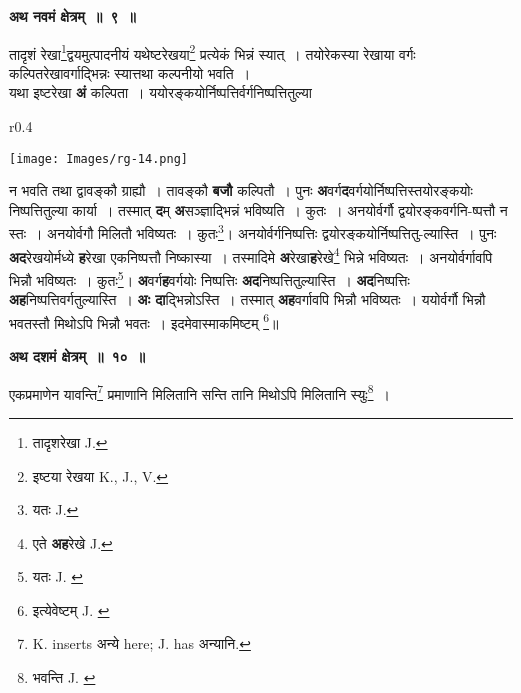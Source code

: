 \documentclass[11pt, openany]{book}
\begin{document}
\begin{center}
\textbf{\large अथ नवमं क्षेत्रम्~॥~९~॥}
\end{center}

{\ab तादृशं रेखा\renewcommand{\thefootnote}{६}\footnote{तादृशरेखा {\en J.}}द्वयमुत्पादनीयं यथेष्टरेखया\renewcommand{\thefootnote}{७}\footnote{इष्टया रेखया {\en K., J., V.}} प्रत्येकं भिन्नं स्यात्~। तयोरेकस्या रेखाया वर्गः कल्पितरेखावर्गाद्भिन्नः स्यात्तथा कल्पनीयो भवति~।} \\

 यथा इष्टरेखा \textbf{अं} कल्पिता~। ययोरङ्कयोर्निष्पत्तिर्वर्गनिष्पत्तितुल्या 

\newpage

\begin{wrapfigure}{r}{0.4\textwidth}
\vspace{-4mm}
\begin{center}
\texttt{[image: Images/rg-14.png]}
\end{center}
\vspace{-8mm}
\end{wrapfigure}

\noindent न भवति तथा द्वावङ्कौ ग्राह्यौ~। तावङ्कौ \textbf{बजौ}  कल्पितौ~। पुनः \textbf{अ}वर्ग\textbf{द}वर्गयोर्निष्पत्तिस्तयोरङ्कयोः निष्पत्तितुल्या कार्या~। तस्मात् \textbf{द}म् \textbf{अ}सञ्ज्ञाद्भिन्नं भविष्यति~। कुतः~। अनयोर्वर्गौ द्वयोरङ्कवर्गनि-ष्पत्तौ न स्तः~। अनयोर्वगौ मिलितौ भविष्यतः~। कुतः\renewcommand{\thefootnote}{१}\footnote{यतः {\en J.}}\;। अनयोर्वर्गनिष्पत्तिः द्वयोरङ्कयोर्निष्पत्तितु-ल्यास्ति~। पुनः \textbf{अद}रेखयोर्मध्ये \textbf{ह}रेखा एकनिष्पत्तौ निष्कास्या~। तस्मादिमे \textbf{अ}रेखा\textbf{ह}रेखे\renewcommand{\thefootnote}{२}\footnote{एते \textbf{अह}रेखे {\en J.}} भिन्ने भविष्यतः~। अनयोर्वर्गावपि भिन्नौ भविष्यतः~। कुतः\renewcommand{\thefootnote}{३}\footnote{यतः {\en J. }}\;। \textbf{अ}वर्ग\textbf{ह}वर्गयोः निष्पत्तिः \textbf{अद}निष्पत्तितुल्यास्ति~। \textbf{अद}निष्पत्तिः \textbf{अह}निष्पत्तिवर्गतुल्यास्ति~। \textbf{अः दा}द्भिन्नोऽस्ति~। तस्मात् \textbf{अह}वर्गावपि भिन्नौ भविष्यतः~। ययोर्वर्गौ भिन्नौ भवतस्तौ मिथोऽपि भिन्नौ भवतः~। इदमेवास्माकमिष्टम्\renewcommand{\thefootnote}{४}
\footnote{इत्येवेष्टम् {\en J. }}\;॥ 
\vspace{2mm}

\begin{center}
\textbf{\large अथ दशमं क्षेत्रम्~॥~१०~॥}
\end{center}

{\ab  एकप्रमाणेन यावन्ति\renewcommand{\thefootnote}{५}\footnote{{\en K. inserts} अन्ये {\en here; J. has} अन्यानि.} प्रमाणानि मिलितानि सन्ति तानि  मिथोऽपि मिलितानि स्युः\renewcommand{\thefootnote}{६}\footnote{भवन्ति {\en J. }}~।}\\
\end{document}
